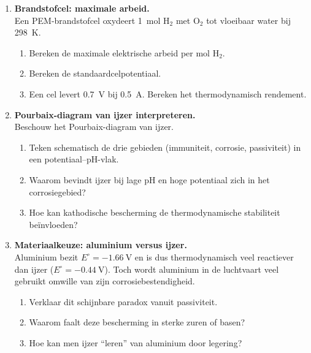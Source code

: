 \begin{enumerate}
\item \textbf{Brandstofcel: maximale arbeid.} \\
Een PEM-brandstofcel oxydeert \SI{1}{\mole} $\mathrm{H_2}$ met $\mathrm{O_2}$ tot vloeibaar water bij \SI{298}{\kelvin}.
\begin{enumerate}
\item[(a)] Bereken de maximale elektrische arbeid per mol $\mathrm{H_2}$.
\item[(b)] Bereken de standaardcelpotentiaal.
\item[(c)] Een cel levert \SI{0.7}{\volt} bij \SI{0.5}{\ampere}. Bereken het thermodynamisch rendement.
\end{enumerate}

\item \textbf{Pourbaix-diagram van ijzer interpreteren.} \\
Beschouw het Pourbaix-diagram van ijzer.
\begin{enumerate}
\item[(a)] Teken schematisch de drie gebieden (immuniteit, corrosie, passiviteit) in een potentiaal--pH-vlak.
\item[(b)] Waarom bevindt ijzer bij lage pH en hoge potentiaal zich in het corrosiegebied?
\item[(c)] Hoe kan kathodische bescherming de thermodynamische stabiliteit be\"invloeden?
\end{enumerate}

\item \textbf{Materiaalkeuze: aluminium versus ijzer.} \\
Aluminium bezit $E^\circ = \SI{-1.66}{\volt}$ en is dus thermodynamisch veel reactiever dan ijzer ($E^\circ = \SI{-0.44}{\volt}$). Toch wordt aluminium in de luchtvaart veel gebruikt omwille van zijn corrosiebestendigheid.
\begin{enumerate}
\item[(a)] Verklaar dit schijnbare paradox vanuit passiviteit.
\item[(b)] Waarom faalt deze bescherming in sterke zuren of basen?
\item[(c)] Hoe kan men ijzer ``leren'' van aluminium door legering?
\end{enumerate}


\end{enumerate}
